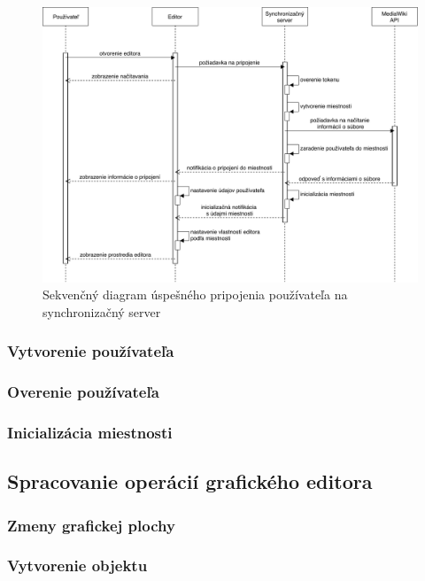 \begin{figure}[h]
	\centerline{\includegraphics[width=1\textwidth]{images/diagrams/sequence-diagram-server-connect}}
	\caption[Sekvenčný diagram pripojenia používateľa]{Sekvenčný diagram úspešného pripojenia používateľa na synchronizačný server}
	\label{obr:sequence-diagram-server-connect}
\end{figure}
\FloatBarrier

\subsubsection{Vytvorenie používateľa}

\subsubsection{Overenie používateľa}

\subsubsection{Inicializácia miestnosti}


\subsection{Spracovanie operácií grafického editora}

\subsubsection{Zmeny grafickej plochy}

\subsubsection{Vytvorenie objektu}

